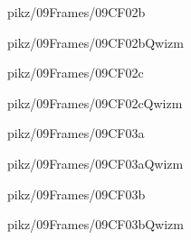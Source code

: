 \documentclass[9pt,xcolor={svgnames, x11names}]{beamer}
\begin{document}

\begin{frame}{pikz/09Frames/09CF02b}
  
\end{frame}


\begin{frame}{pikz/09Frames/09CF02bQwizm}
  
\end{frame}


\begin{frame}{pikz/09Frames/09CF02c}
  
\end{frame}


\begin{frame}{pikz/09Frames/09CF02cQwizm}
  
\end{frame}


\begin{frame}{pikz/09Frames/09CF03a}
  
\end{frame}


\begin{frame}{pikz/09Frames/09CF03aQwizm}
  
\end{frame}


\begin{frame}{pikz/09Frames/09CF03b}
  
\end{frame}


\begin{frame}{pikz/09Frames/09CF03bQwizm}
  
\end{frame}
\end{document}
